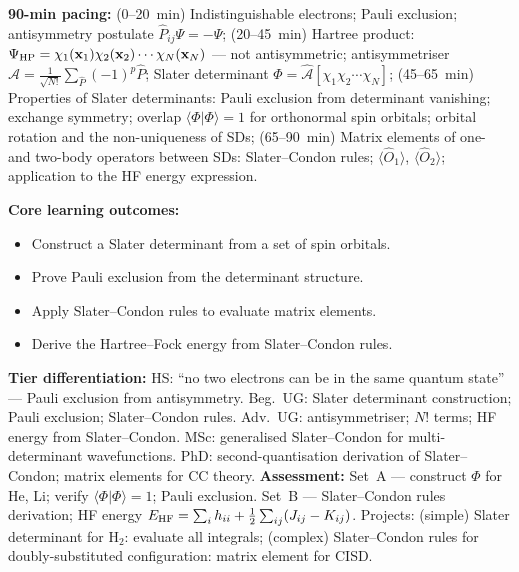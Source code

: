 \documentclass[11pt,a4paper]{article}
\begin{document}
\medskip

\begin{tcolorbox}[chembox, title={Module~III.2 --- Lecture L05: Antisymmetry, Hartree Products, and Slater Determinants}]
\textbf{90-min pacing:} (0--20~min) Indistinguishable electrons; Pauli exclusion; antisymmetry postulate $\hat{P}_{ij}\Psi=-\Psi$; (20--45~min) Hartree product: $\Psi_{\rm HP}=\chi_1(\mathbf{x}_1)\chi_2(\mathbf{x}_2)\cdots\chi_N(\mathbf{x}_N)$ --- not antisymmetric; antisymmetriser $\hat{\mathcal{A}}=\tfrac{1}{\sqrt{N!}}\sum_{\hat{P}}(-1)^p\hat{P}$; Slater determinant $\Phi=\hat{\mathcal{A}}[\chi_1\chi_2\cdots\chi_N]$; (45--65~min) Properties of Slater determinants: Pauli exclusion from determinant vanishing; exchange symmetry; overlap $\langle\Phi|\Phi\rangle=1$ for orthonormal spin orbitals; orbital rotation and the non-uniqueness of SDs; (65--90~min) Matrix elements of one- and two-body operators between SDs: Slater--Condon rules; $\langle\hat{O}_1\rangle$, $\langle\hat{O}_2\rangle$; application to the HF energy expression.

\medskip\textbf{Core learning outcomes:}
\begin{itemize}[leftmargin=1.4em,topsep=2pt,itemsep=1pt]
  \item Construct a Slater determinant from a set of spin orbitals.
  \item Prove Pauli exclusion from the determinant structure.
  \item Apply Slater--Condon rules to evaluate matrix elements.
  \item Derive the Hartree--Fock energy from Slater--Condon rules.
\end{itemize}
\medskip\textbf{Tier differentiation:}
HS: ``no two electrons can be in the same quantum state'' --- Pauli exclusion from antisymmetry.
Beg.\ UG: Slater determinant construction; Pauli exclusion; Slater--Condon rules.
Adv.\ UG: antisymmetriser; $N!$ terms; HF energy from Slater--Condon.
MSc: generalised Slater--Condon for multi-determinant wavefunctions.
PhD: second-quantisation derivation of Slater--Condon; matrix elements for CC theory.
\medskip\textbf{Assessment:}
Set~A --- construct $\Phi$ for He, Li; verify $\langle\Phi|\Phi\rangle=1$; Pauli exclusion.
Set~B --- Slater--Condon rules derivation; HF energy $E_{\rm HF}=\sum_i h_{ii}+\tfrac{1}{2}\sum_{ij}(J_{ij}-K_{ij})$.
Projects: (simple) Slater determinant for H$_2$: evaluate all integrals; (complex) Slater--Condon rules for doubly-substituted configuration: matrix element for CISD.
\end{tcolorbox}
\end{document}
